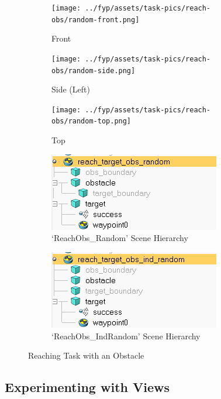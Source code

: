 \begin{figure}[htpb] %
  \centering
  \begin{subfigure}{0.3\linewidth}
    \centering
    \texttt{[image: ../fyp/assets/task-pics/reach-obs/random-front.png]}
    \caption{Front}
  \end{subfigure}
  \hfill
  \begin{subfigure}{0.3\linewidth}
    \centering
    \texttt{[image: ../fyp/assets/task-pics/reach-obs/random-side.png]}
    \caption{Side (Left)}
  \end{subfigure}
  \hfill
  \begin{subfigure}{0.3\linewidth}
    \centering
    \texttt{[image: ../fyp/assets/task-pics/reach-obs/random-top.png]}
    \caption{Top}
  \end{subfigure}
  \vfill
  \begin{subfigure}{0.45\linewidth}
    \centering
    \includegraphics[scale=0.5]{assets/early-work/obs-random-scene-hierarchy.png}
    \caption{`ReachObs\_Random' Scene Hierarchy}
  \end{subfigure}
  \hfill
  \begin{subfigure}{0.45\linewidth}
    \centering
    \includegraphics[scale=0.5]{assets/early-work/obs-ind-random-scene-hierarchy.png}
    \caption{`ReachObs\_IndRandom' Scene Hierarchy}
  \end{subfigure}
  \caption{Reaching Task with an Obstacle}\label{fig:reach-obs-random}
\end{figure} 

\subsection{Experimenting with Views}


